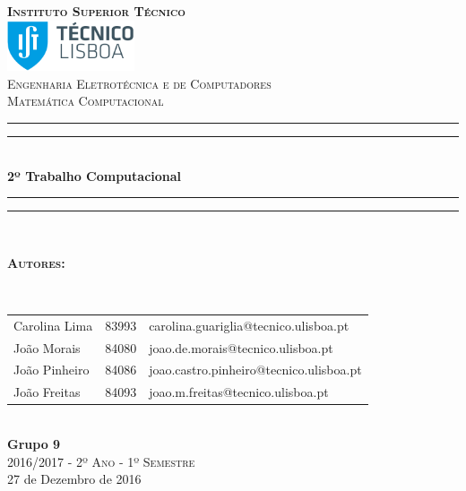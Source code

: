 \documentclass[a4paper, 18pt]{article}
\begin{document}
\begin{titlepage}

\thispagestyle{empty}
\newcommand{\HRule}{\rule{\linewidth}{0.5mm}} %
\center
\textsc{\bfseries\LARGE Instituto Superior Técnico}\\[1cm] %
\includegraphics[height=1.5cm]{IST_Logo.pdf}\\[2.5cm]
\textsc{\Large Engenharia Eletrotécnica e de Computadores}\\[0.5cm] %
\textsc{\large Matemática Computacional}\\[0.5cm] %

\rule{\textwidth}{1.6pt}\vspace*{-\baselineskip}\vspace*{2pt} %
\rule{\textwidth}{0.4pt}\\[\baselineskip] %

{\Huge \bfseries 2º Trabalho Computacional}\\[0.2cm]

\rule{\textwidth}{0.4pt}\vspace*{-\baselineskip}\vspace{3.2pt} %
\rule{\textwidth}{1.6pt}\\[1.5cm]


\begin{minipage}{0.9\textwidth}
	\begin{flushleft} \large
		\begin{Large}\bfseries\textsc{Autores:}\end{Large}\\[0.4cm]
		\begin{tabular}{l l l}
			Carolina Lima & 83993 & \normalsize carolina.guariglia@tecnico.ulisboa.pt \\
			João Morais   & 84080 & \normalsize	joao.de.morais@tecnico.ulisboa.pt \\
			João Pinheiro & 84086 & \normalsize joao.castro.pinheiro@tecnico.ulisboa.pt \\
			João Freitas  & 84093 & \normalsize joao.m.freitas@tecnico.ulisboa.pt \\
		\end{tabular}
	\end{flushleft}
\end{minipage}\\[0.5cm]


{\bfseries Grupo 9}\\[1cm]
\large\textsc{ 2016/2017 - 2º Ano - 1º Semestre}\\
\large 27 de Dezembro de 2016\\[1cm]

\end{titlepage}
\end{document}

